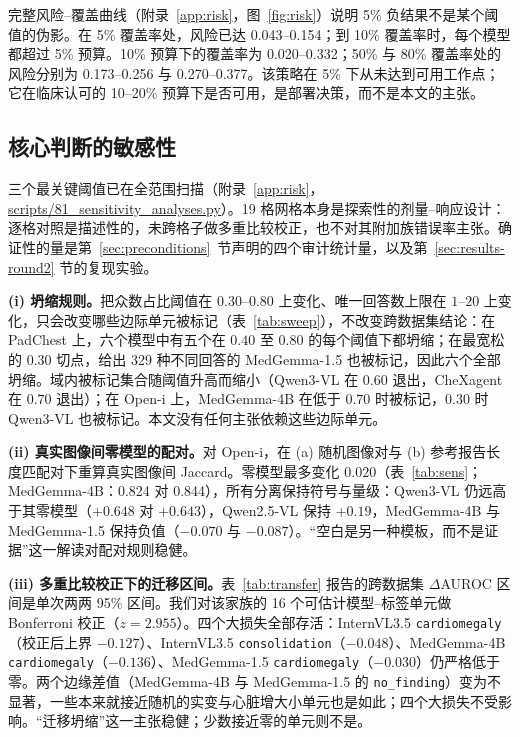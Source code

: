 完整风险--覆盖曲线（附录~\ref{app:risk}，图~\ref{fig:risk}）说明 5\% 负结果不是某个阈值的伪影。在 5\% 覆盖率处，风险已达 0.043--0.154；到 10\% 覆盖率时，每个模型都超过 5\% 预算。10\% 预算下的覆盖率为 0.020--0.332；50\% 与 80\% 覆盖率处的风险分别为 0.173--0.256 与 0.270--0.377。该策略在 5\% 下从未达到可用工作点；它在临床认可的 10--20\% 预算下是否可用，是部署决策，而不是本文的主张。



\subsection{核心判断的敏感性}
\label{sec:sensitivity}

三个最关键阈值已在全范围扫描（附录~\ref{app:risk}，\url{scripts/81_sensitivity_analyses.py}）。19 格网格本身是探索性的剂量--响应设计：逐格对照是描述性的，未跨格子做多重比较校正，也不对其附加族错误率主张。确证性的量是第~\ref{sec:preconditions}~节声明的四个审计统计量，以及第~\ref{sec:results-round2} 节的复现实验。

\textbf{(i) 坍缩规则。}把众数占比阈值在 $0.30$--$0.80$ 上变化、唯一回答数上限在 $1$--$20$ 上变化，只会改变哪些边际单元被标记（表~\ref{tab:sweep}），不改变跨数据集结论：在 PadChest 上，六个模型中有五个在 $0.40$ 至 $0.80$ 的每个阈值下都坍缩；在最宽松的 $0.30$ 切点，给出 329 种不同回答的 MedGemma-1.5 也被标记，因此六个全部坍缩。域内被标记集合随阈值升高而缩小（Qwen3-VL 在 $0.60$ 退出，CheXagent 在 $0.70$ 退出）；在 Open-i 上，MedGemma-4B 在低于 $0.70$ 时被标记，$0.30$ 时 Qwen3-VL 也被标记。本文没有任何主张依赖这些边际单元。

\textbf{(ii) 真实图像间零模型的配对。}对 Open-i，在 (a) 随机图像对与 (b) 参考报告长度匹配对下重算真实图像间 Jaccard。零模型最多变化 $0.020$（表~\ref{tab:sens}；MedGemma-4B：0.824 对 0.844），所有分离保持符号与量级：Qwen3-VL 仍远高于其零模型（$+0.648$ 对 $+0.643$），Qwen2.5-VL 保持 $+0.19$，MedGemma-4B 与 MedGemma-1.5 保持负值（$-0.070$ 与 $-0.087$）。``空白是另一种模板，而不是证据''这一解读对配对规则稳健。

\textbf{(iii) 多重比较校正下的迁移区间。}表~\ref{tab:transfer} 报告的跨数据集 $\Delta$AUROC 区间是单次两两 95\% 区间。我们对该家族的 16 个可估计模型--标签单元做 Bonferroni 校正（$z=2.955$）。四个大损失全部存活：InternVL3.5 \texttt{cardiomegaly}（校正后上界 $-0.127$）、InternVL3.5 \texttt{consolidation}（$-0.048$）、MedGemma-4B \texttt{cardiomegaly}（$-0.136$）、MedGemma-1.5 \texttt{cardiomegaly}（$-0.030$）仍严格低于零。两个边缘差值（MedGemma-4B 与 MedGemma-1.5 的 \texttt{no\_finding}）变为不显著，一些本来就接近随机的实变与心脏增大小单元也是如此；四个大损失不受影响。``迁移坍缩''这一主张稳健；少数接近零的单元则不是。

